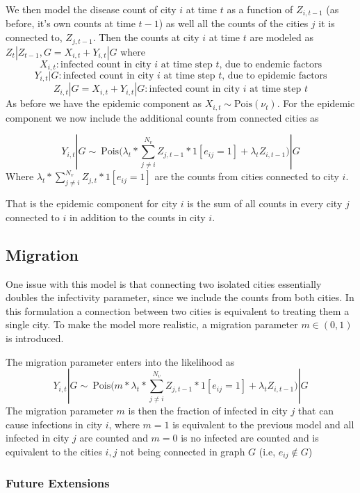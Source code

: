 \documentclass[11pt,a4paper]{article}
\numberwithin{equation}{section}
\begin{document}
We then model the disease count of city \(i\) at time \(t\) as a
function of \(Z_{i,t-1}\) (as before, it's own counts at time \(t-1\))
as well all the counts of the cities \(j\) it is connected to,
\(Z_{j,t-1}\). Then the counts at city \(i\) at time \(t\) are modeled
as \(Z_t|Z_{t-1}, G = X_{i, t} + Y_{i,t}|G\) where
\[X_{i,t}: \text{infected count in city } i \text{ at time step } t \text{, due to endemic factors}   \]
\[Y_{i,t}|G : \text{infected count in city } i \text{ at time step } t \text{, due to epidemic factors}\]
\[Z_{i,t}|G = X_{i,t} + Y_{i,t}|G: \text{infected count in city } i \text{ at time step } t \]
As before we have the epidemic component as
\(X_{i,t} \sim\text{Pois}(\nu_t)\). For the epidemic component we now
include the additional counts from connected cities as

\[Y_{i,t}|G \sim ~ \text{Pois}\big(\lambda_t*\sum_{j\neq i}^{N_v}Z_{j,t-1}*1[e_{ij}=1]+ \lambda_tZ_{i,t-1}\big)|G \]
Where \(\lambda_t*\sum_{j\neq i}^{N_v}Z_{j,t}*1[e_{ij}=1]\) are the
counts from cities connected to city \(i\).

That is the epidemic component for city \(i\) is the sum of all counts
in every city \(j\) connected to \(i\) in addition to the counts in city
\(i\).

\hypertarget{migration}{%
\subsection{Migration}\label{migration}}

One issue with this model is that connecting two isolated cities
essentially doubles the infectivity parameter, since we include the
counts from both cities. In this formulation a connection between two
cities is equivalent to treating them a single city. To make the model
more realistic, a migration parameter \(m \in (0,1)\) is introduced.

The migration parameter enters into the likelihood as
\[Y_{i,t}|G \sim ~ \text{Pois}\big(m*\lambda_t*\sum_{j\neq i}^{N_v}Z_{j,t-1}*1[e_{ij}=1]+ \lambda_tZ_{i,t-1}\big)|G \]
The migration parameter \(m\) is then the fraction of infected in city
\(j\) that can cause infections in city \(i\), where \(m = 1\) is
equivalent to the previous model and all infected in city \(j\) are
counted and \(m = 0\) is no infected are counted and is equivalent to
the cities \(i,j\) not being connected in graph \(G\) (i.e,
\(e_{ij} \notin G\))

\hypertarget{future-extensions}{%
\subsubsection{Future Extensions}\label{future-extensions}}
\end{document}
